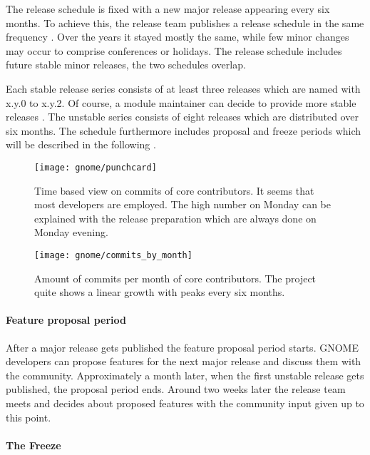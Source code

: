 The release schedule is fixed with a new major release appearing every six
months. To achieve this, the release team publishes a release schedule in the
same frequency \cite{GNOMEDevelopmentSchedule}. Over the years it stayed mostly
the same, while few minor changes may occur to comprise conferences or
holidays. The release schedule includes future stable minor releases, the two
schedules overlap.

Each stable release series consists of at least three releases which are named
with x.y.0 to x.y.2. Of course, a module maintainer can decide to provide more
stable releases \cite{GNOMEReleaseTeam}. The unstable series consists of eight
releases which are distributed over six months. The schedule furthermore
includes proposal and freeze periods which will be described in the following
\cite{GNOMEDevelopmentSchedule,GNOMESchedule}.

\begin{figure}[bhtp]
  \centering
  \texttt{[image: gnome/punchcard]}
  \caption[Time Based View on Commits, GNOME]
  {Time based view on commits of core contributors. It seems that most
    developers are employed. The high number on Monday can be explained with
    the release preparation which are always done on Monday evening.}
\end{figure}

\begin{figure}[htbp]
  \centering
  \texttt{[image: gnome/commits\_by\_month]}
  \caption[Commits by Month, GNOME]
  {Amount of commits per month of core contributors. The project quite shows a
    linear growth with peaks every six months.}
\end{figure}

\paragraph{Feature proposal period}

After a major release gets published the feature proposal period starts. GNOME
developers can propose features for the next major release and discuss them
with the community. Approximately a month later, when the first unstable
release gets published, the proposal period ends. Around two weeks later the
release team meets and decides about proposed features with the community input
given up to this point.

\paragraph{The Freeze}

